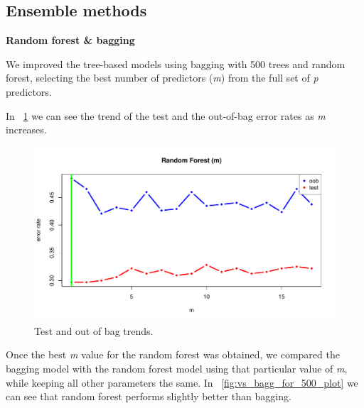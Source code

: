 \subsection{Ensemble methods}

\vspace{0.2cm}
\noindent
\textbf{Random forest \& bagging}

We improved the tree-based models using bagging with 500 trees and random forest, selecting the best number of predictors (\textit{m}) from the full set of \textit{p} predictors.

In \Fig~\ref{fig:m_best_for_500_plot} we can see the trend of the test and the out-of-bag error rates as \textit{m} increases.

\begin{figure}[H]
	\centering
	\includegraphics[width=0.5\linewidth]{ImageFiles/Classification/Trees/m_best_for_500_plot.pdf}
	\caption{Test and out of bag trends.}
	\label{fig:m_best_for_500_plot}
\end{figure}

Once the best \textit{m} value for the random forest was obtained, we compared the bagging model with the random forest model using that particular value of \textit{m}, while keeping all other parameters the same.
In \Fig~\ref{fig:vs_bagg_for_500_plot} we can see that random forest performs slightly better than bagging.

